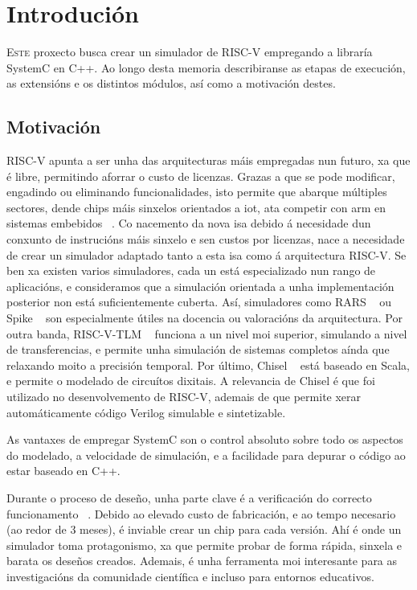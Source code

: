 \chapter{Introdución}
\label{chap:introducion}

\lettrine{E}{ste} proxecto busca crear un simulador de RISC-V empregando a libraría SystemC en C++. Ao longo desta memoria describiranse as etapas de execución, as extensións e os distintos módulos, así como a motivación destes.

\section{Motivación}
\label{sec:motivación}
RISC-V apunta a ser unha das arquitecturas máis empregadas nun futuro, xa que é libre, permitindo aforrar o custo de licenzas. Grazas a que se pode modificar, engadindo ou eliminando funcionalidades, isto permite que abarque múltiples sectores, dende \gls{chips} máis sinxelos orientados a \acrfull{iot}, ata competir con \acrshort{arm} en sistemas embebidos ~\cite{RISCV_IoT,RISCV_vsARM}. Co nacemento da nova \acrfull{isa} debido á necesidade dun conxunto de instrucións máis sinxelo e sen custos por licenzas, nace a necesidade de crear un simulador adaptado tanto a esta \acrshort{isa} como á arquitectura RISC-V. Se ben xa existen varios simuladores, cada un está especializado nun rango de aplicacións, e consideramos que a simulación orientada a unha implementación posterior non está suficientemente cuberta. Así, simuladores como RARS ~\cite{rars} ou Spike ~\cite{sim_spike} son especialmente útiles na docencia ou valoracións da arquitectura. Por outra banda, RISC-V-TLM ~\cite{riscv_tlm} funciona a un nivel moi superior, simulando a nivel de transferencias, e permite unha simulación de sistemas completos aínda que relaxando moito a precisión temporal. Por último, Chisel ~\cite{chisel} está baseado en Scala, e permite o modelado de circuítos dixitais. A relevancia de Chisel é que foi utilizado no desenvolvemento de RISC-V, ademais de que permite xerar automáticamente código Verilog simulable e sintetizable.

As vantaxes de empregar SystemC son o control absoluto sobre todo os aspectos do modelado, a velocidade de simulación, e a facilidade para depurar o código ao estar baseado en C++.

Durante o proceso de deseño, unha parte clave é a verificación do correcto funcionamento ~\cite{ChipVerify_verification,RISCV_verification}. Debido ao elevado custo de fabricación, e ao tempo necesario (ao redor de 3 meses), é inviable crear un chip para cada versión. Ahí é onde un simulador toma protagonismo, xa que permite probar de forma rápida, sinxela e barata os deseños creados. Ademais, é unha ferramenta moi interesante para as investigacións da comunidade científica e incluso para entornos educativos.

